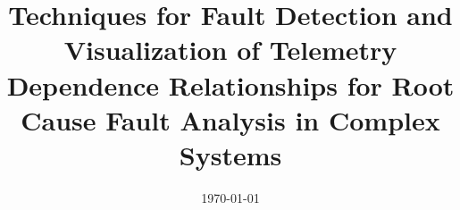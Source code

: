 \documentclass[a4paper, 11pt, oneside]{Thesis}  %
\begin{document}
\frontmatter      %

\title {Techniques for Fault Detection and Visualization of Telemetry Dependence Relationships for Root Cause Fault Analysis in Complex Systems}
\addresses  {\groupname\\\deptname\\\univname}  %
\date       {\today}
\subject    {}
\keywords   {}

\maketitle


\fancyhead{}  %
\rhead{\thepage}  %
\lhead{}  %

\pagestyle{fancy}  %
\end{document}
